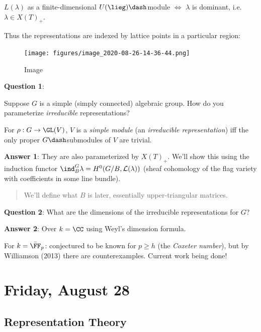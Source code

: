 \begin{theorem}[?]

\(L(\lambda)\) as a finite-dimensional \(U(\lieg)\dash\)module \(\iff\)
\(\lambda\) is dominant, i.e.~\(\lambda \in X(T)_+\).

\end{theorem}

Thus the representations are indexed by lattice points in a particular
region:

\begin{figure}
\centering
\texttt{[image: figures/image\_2020-08-26-14-36-44.png]}
\caption{Image}
\end{figure}

\textbf{Question 1}:

Suppose \(G\) is a simple (simply connected) algebraic group. How do you
parameterize \emph{irreducible} representations?

For \(\rho: G\to \GL(V)\), \(V\) is a \emph{simple module} (an
\emph{irreducible representation}) iff the only proper
\(G\dash\)submodules of \(V\) are trivial.

\textbf{Answer 1}: They are also parameterized by \(X(T)_+\). We'll show
this using the induction functor
\(\ind_B^G \lambda =H^0(G/B, \mathcal{L}(\lambda))\) (sheaf cohomology
of the flag variety with coefficients in some line bundle).

\begin{quote}
We'll define what \(B\) is later, essentially upper-triangular matrices.
\end{quote}

\textbf{Question 2}: What are the dimensions of the irreducible
representations for \(G\)?

\textbf{Answer 2}: Over \(k=\CC\) using Weyl's dimension formula.

For \(k = \bar{\FF}_p\): conjectured to be known for \(p\geq h\) (the
\emph{Coxeter number}), but by Williamson (2013) there are
counterexamples. Current work being done!

\hypertarget{friday-august-28}{%
\section{Friday, August 28}\label{friday-august-28}}

\hypertarget{representation-theory}{%
\subsection{Representation Theory}\label{representation-theory}}

